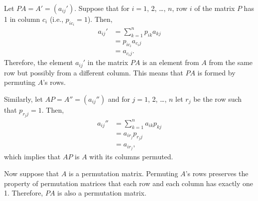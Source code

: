 Let $PA=A'=(a_{ij}')$.
Suppose that for $i=1$, 2, \dots, $n$, row $i$ of the matrix $P$ has 1 in column $c_i$ (i.e., $p_{ic_i}=1$).
Then,
\begin{align*}
    a_{ij}' &= \sum_{k=1}^np_{ik}a_{kj} \\
    &= p_{ic_i}a_{c_ij} \\
    &= a_{c_ij}.
\end{align*}
Therefore, the element $a_{ij}'$ in the matrix $PA$ is an element from $A$ from the same row but possibly from a different column.
This means that $PA$ is formed by permuting $A$'s rows.

Similarly, let $AP=A''=(a_{ij}'')$ and for $j=1$, 2, \dots, $n$ let $r_j$ be the row such that $p_{r_jj}=1$.
Then,
\begin{align*}
    a_{ij}'' &= \sum_{k=1}^na_{ik}p_{kj} \\
    &= a_{ir_j}p_{r_jj} \\
    &= a_{ir_j},
\end{align*}
which implies that $AP$ is $A$ with its columns permuted.

Now suppose that $A$ is a permutation matrix.
Permuting $A$'s rows preserves the property of permutation matrices that each row and each column has exactly one 1.
Therefore, $PA$ is also a permutation matrix.
